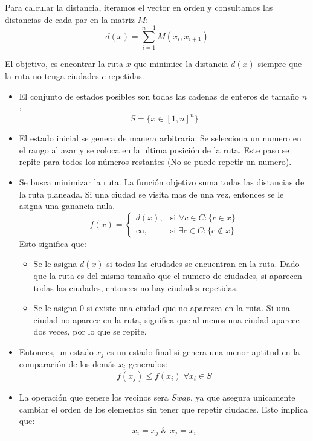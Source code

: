 \documentclass[12pt,twoside]{article}
\begin{document}
	Para calcular la distancia, iteramos el vector en orden y consultamos las distancias de cada par en la matriz $M$: 
	\[ d(x) = \sum_{i = 1}^{n - 1} M(x_i, x_{i + 1}) \]
	
	El objetivo, es encontrar la ruta $x$ que minimice la distancia $d(x)$ siempre que la ruta no tenga ciudades $c$ repetidas.
	
	\begin{itemize}
		\item El conjunto de estados posibles son todas las cadenas de enteros de tamaño $n$: \[ S = \{ x \in [1, n]^n \} \]
		
		\item El estado inicial se genera de manera arbitraria. Se selecciona un numero en el rango al azar y se coloca en la ultima posición de la ruta. Este paso se repite para todos los números restantes (No se puede repetir un numero). 
	
		\item Se busca minimizar la ruta. La función objetivo suma todas las distancias de la ruta planeada. Si una ciudad se visita mas de una vez, entonces se le asigna una ganancia nula.
		\[
		f(x) =
		\begin{cases} 
			d(x), & \text{si } \forall c \in C \colon \{ c \in x \} \\ 
			\infty, & \text{si } \exists c \in C \colon \{c \notin x\}
		\end{cases}
		\]
		Esto significa que:
		\begin{itemize}
			\item Se le asigna $d(x)$ si todas las ciudades se encuentran en la ruta. Dado que la ruta es del mismo tamaño que el numero de ciudades, si aparecen todas las ciudades, entonces no hay ciudades repetidas.
			\item Se le asigna 0 si existe una ciudad que no aparezca en la ruta. Si una ciudad no aparece en la ruta, significa que al menos una ciudad aparece dos veces, por lo que se repite.
		\end{itemize}
	
	\item Entonces, un estado $x_j$ es un estado final si genera una menor aptitud en la comparación de los demás $x_i$ generados: \[ f(x_j) \leq f(x_i) \; \forall x_i \in S \]
	
	\item La operación que genere los vecinos sera \textit{Swap}, ya que asegura unicamente cambiar el orden de los elementos sin tener que repetir ciudades. Esto implica que: \[ x_i = x_j \; \&  \; x_j = x_i \]
	
	\end{itemize}
	
\end{document}
